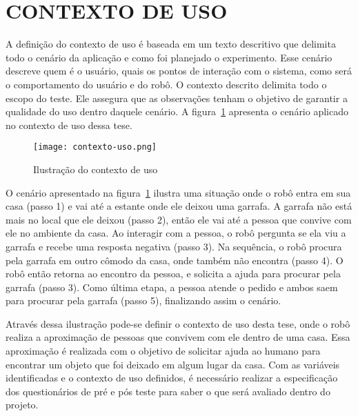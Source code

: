 \section{CONTEXTO DE USO}
\label{sec:ec_contextouso}
A definição do contexto de uso é baseada em um texto descritivo que delimita todo o cenário da aplicação e como foi planejado o experimento. Esse cenário descreve quem é o usuário, quais os pontos de interação com o sistema, como será o comportamento do usuário e do robô. O contexto descrito delimita todo o escopo do teste. Ele assegura que as observações tenham o objetivo de garantir a qualidade do uso dentro daquele cenário. A figura~\ref{fig:contextouso} apresenta o cenário aplicado no contexto de uso dessa tese.

\begin{figure}[ht!]
	\centering
	\begin{minipage}{\textwidth}
		\caption{Ilustração do contexto de uso}
		\texttt{[image: contexto-uso.png]}
		\label{fig:contextouso}
	\end{minipage}
\end{figure}

O cenário apresentado na figura~\ref{fig:contextouso} ilustra uma situação onde o robô entra em sua casa (passo 1) e vai até a estante onde ele deixou uma garrafa. A garrafa não está mais no local que ele deixou (passo 2), então ele vai até a pessoa que convive com ele no ambiente da casa. Ao interagir com a pessoa, o robô pergunta se ela viu a garrafa e recebe uma resposta negativa (passo 3). Na sequência, o robô procura pela garrafa em outro cômodo da casa, onde também não encontra (passo 4). O robô então retorna ao encontro da pessoa, e solicita a ajuda para procurar pela garrafa (passo 3). Como última etapa, a pessoa atende o pedido e ambos saem para procurar pela garrafa (passo 5), finalizando assim o cenário.

Através dessa ilustração pode-se definir o contexto de uso desta tese, onde o robô realiza a aproximação de pessoas que convivem com ele dentro de uma casa. Essa aproximação é realizada com o objetivo de solicitar ajuda ao humano para encontrar um objeto que foi deixado em algum lugar da casa. Com as variáveis identificadas e o contexto de uso definidos, é necessário realizar a especificação dos questionários de pré e pós teste para saber o que será avaliado dentro do projeto.


